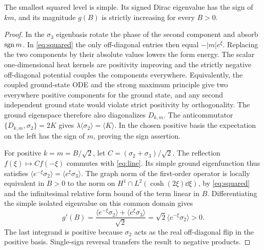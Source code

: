 \begin{lemma}\label{lem:ground}
The smallest squared level is simple. Its signed Dirac eigenvalue has the sign of \(km\), and its magnitude \(g(B)\) is strictly increasing for every \(B>0\).
\end{lemma}
\begin{proof}
In the \(\sigma_3\) eigenbasis rotate the phase of the second component and absorb \(\operatorname{sgn} m\). In \eqref{eq:squared} the only off-diagonal entries then equal \(-|m|e^\xi\). Replacing the two components by their absolute values lowers the form energy. The scalar one-dimensional heat kernels are positivity improving and the strictly negative off-diagonal potential couples the components everywhere. Equivalently, the coupled ground-state ODE and the strong maximum principle give two everywhere positive components for the ground state, and any second independent ground state would violate strict positivity by orthogonality. The ground eigenspace therefore also diagonalizes \(D_{k,m}\). The anticommutator \(\{D_{k,m},\sigma_2\}=2K\) gives \(\lambda\langle\sigma_2\rangle=\langle K\rangle\). In the chosen positive basis the expectation on the left has the sign of \(m\), proving the sign assertion.

For positive \(k=m=B/\sqrt2\), let \(C=(\sigma_2+\sigma_3)/\sqrt2\). The reflection \(f(\xi)\mapsto C f(-\xi)\) commutes with \eqref{eq:line}. Its simple ground eigenfunction thus satisfies
\(\langle e^{-\xi}\sigma_2\rangle=\langle e^\xi\sigma_3\rangle\).
The graph norm of the first-order operator is locally equivalent in \(B>0\) to the norm on \(H^1\cap L^2(\cosh(2\xi)\dd\xi)\), by \eqref{eq:squared} and the infinitesimal relative form bound of the term linear in \(B\). Differentiating the simple isolated eigenvalue on this common domain gives
\[
 g'(B)=\frac{\langle e^{-\xi}\sigma_2\rangle+\langle e^\xi\sigma_3\rangle}{\sqrt2}
       =\sqrt2\langle e^{-\xi}\sigma_2\rangle>0 .
\]
The last integrand is positive because \(\sigma_2\) acts as the real off-diagonal flip in the positive basis. Single-sign reversal transfers the result to negative products.
\end{proof}

